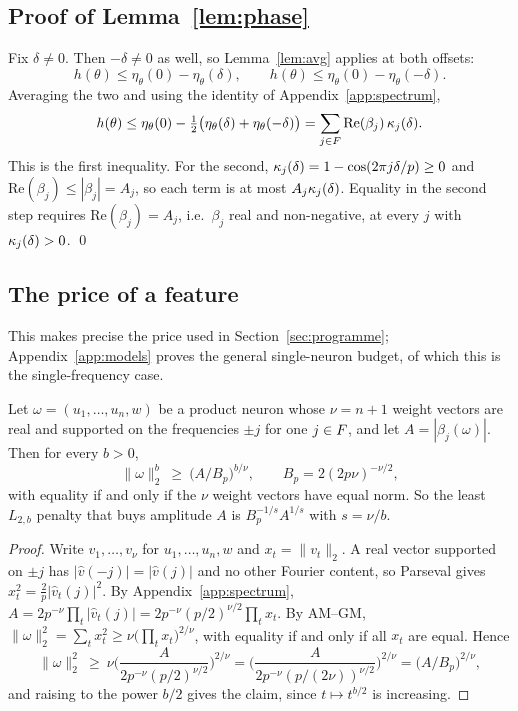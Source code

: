 \subsection{Proof of Lemma~\ref{lem:phase}}\label{app:phase}

Fix $\delta\neq0$. Then $-\delta\neq0$ as well, so Lemma~\ref{lem:avg} applies at both offsets:
\[
h(\theta)\le\eta_\theta(0)-\eta_\theta(\delta),\qquad h(\theta)\le\eta_\theta(0)-\eta_\theta(-\delta).
\]
Averaging the two and using the identity of Appendix~\ref{app:spectrum},
\[
h(\theta)\le\eta_\theta(0)-\tfrac12\big(\eta_\theta(\delta)+\eta_\theta(-\delta)\big)=\sum_{j\in F}\mathrm{Re}(\beta_j)\,\kappa_{j}(\delta).
\]
This is the first inequality. For the second, $\kappa_{j}(\delta)=1-\cos(2\pi j\delta/p)\ge0$ and $\mathrm{Re}(\beta_j)\le|\beta_j|=A_j$, so each term is at most $A_j\kappa_{j}(\delta)$. Equality in the second step requires $\mathrm{Re}(\beta_j)=A_j$, i.e.\ $\beta_j$ real and non-negative, at every $j$ with $\kappa_{j}(\delta)>0$.
\qed

\subsection{The price of a feature}\label{app:price}

This makes precise the price used in Section~\ref{sec:programme}; Appendix~\ref{app:models} proves the general single-neuron budget, of which this is the single-frequency case.

\begin{lemma}\label{lem:price}
Let $\omega=(u_1,\dots,u_n,w)$ be a product neuron whose $\nu=n+1$ weight vectors are real and supported on the frequencies $\pm j$ for one $j\in F$, and let $A=|\beta_j(\omega)|$. Then for every $b>0$,
\[
\|\omega\|_2^b\ \ge\ \big(A/B_p\big)^{b/\nu},\qquad B_p=2(2p\nu)^{-\nu/2},
\]
with equality if and only if the $\nu$ weight vectors have equal norm. So the least $L_{2,b}$ penalty that buys amplitude $A$ is $B_p^{-1/s}A^{1/s}$ with $s=\nu/b$.
\end{lemma}
\begin{proof}
Write $v_1,\dots,v_\nu$ for $u_1,\dots,u_n,w$ and $x_t=\|v_t\|_2$. A real vector supported on $\pm j$ has $|\hat v(-j)|=|\hat v(j)|$ and no other Fourier content, so Parseval gives $x_t^2=\frac2p|\hat v_t(j)|^2$. By Appendix~\ref{app:spectrum}, $A=2p^{-\nu}\prod_t|\hat v_t(j)|=2p^{-\nu}(p/2)^{\nu/2}\prod_tx_t$. By AM--GM, $\|\omega\|_2^2=\sum_tx_t^2\ge\nu\big(\prod_tx_t\big)^{2/\nu}$, with equality if and only if all $x_t$ are equal. Hence
\[
\|\omega\|_2^2\ \ge\ \nu\Big(\frac{A}{2p^{-\nu}(p/2)^{\nu/2}}\Big)^{2/\nu}=\Big(\frac{A}{2p^{-\nu}(p/(2\nu))^{\nu/2}}\Big)^{2/\nu}=\big(A/B_p\big)^{2/\nu},
\]
and raising to the power $b/2$ gives the claim, since $t\mapsto t^{b/2}$ is increasing.
\end{proof}

